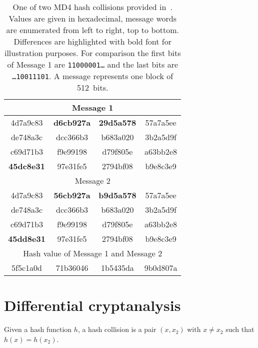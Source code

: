 \begin{table}[bt]
  \begin{center}
    \begin{tabular}{cccc}
      \hline \hline
      \multicolumn{4}{c}{Message 1} \\
      \hline
      4d7a9c83 & \textbf{d6cb927a} & \textbf{29d5a578} & 57a7a5ee \\
      de748a3c & dcc366b3 & b683a020 & 3b2a5d9f \\
      c69d71b3 & f9e99198 & d79f805e & a63bb2e8 \\
      \textbf{45dc8e31} & 97e31fe5 & 2794bf08 & b9e8c3e9 \\
      \hline
      \multicolumn{4}{c}{Message 2} \\
      \hline
      4d7a9c83 & \textbf{56cb927a} & \textbf{b9d5a578} & 57a7a5ee \\
      de748a3c & dcc366b3 & b683a020 & 3b2a5d9f \\
      c69d71b3 & f9e99198 & d79f805e & a63bb2e8 \\
      \textbf{45dd8e31} & 97e31fe5 & 2794bf08 & b9e8c3e9 \\
      \hline
      \multicolumn{4}{c}{Hash value of Message 1 and Message 2} \\
      \hline
      5f5c1a0d & 71b36046 & 1b5435da & 9b0d807a \\
      \hline \hline
    \end{tabular}
    \caption[Hexadecimal values of one MD4 collisions given in paper~\cite{wang2004}]{
      One of two MD4 hash collisions provided in~\cite{wang2004}.
      Values are given in hexadecimal, message words are enumerated from
      left to right, top to bottom. Differences are highlighted with
      bold font for illustration purposes. For comparison the first bits
      of Message 1 are \texttt{11000001\dots} and the last bits are
      \texttt{\dots10011101}.
      A message represents one block of 512~bits.
    }
    \label{tab:wang-md4-collision1}
  \end{center}
\end{table}

\section{Differential cryptanalysis}
\label{sec:intro-diff-cryptanalysis}
%
\begin{defi}
  Given a hash function $h$,
  a hash collision is a pair $(x, x_2)$ with $x \neq x_2$ such that
  $h(x) = h(x_2)$.
\end{defi}

